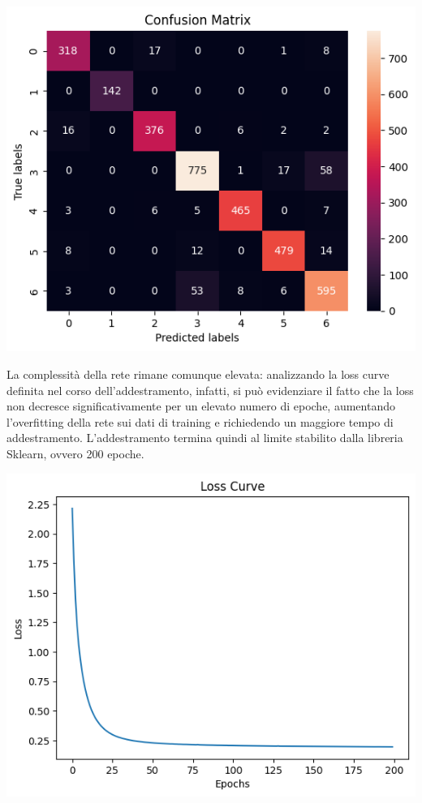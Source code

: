 \begin{Figure}
    \centering
    \includegraphics[width=\linewidth]{img/mlp_low_confusion_matrix.png}
\end{Figure}

La complessità della rete rimane comunque elevata: analizzando la loss curve
definita nel corso dell'addestramento, infatti, si può evidenziare il fatto
che la loss non decresce significativamente per un elevato numero di epoche,
aumentando l'overfitting della rete sui dati di training e richiedendo un maggiore
tempo di addestramento. L'addestramento termina quindi al limite stabilito
dalla libreria Sklearn, ovvero 200 epoche.

\begin{Figure}
    \centering
    \includegraphics[width=\linewidth]{img/mlp_low_loss.png}
\end{Figure}

